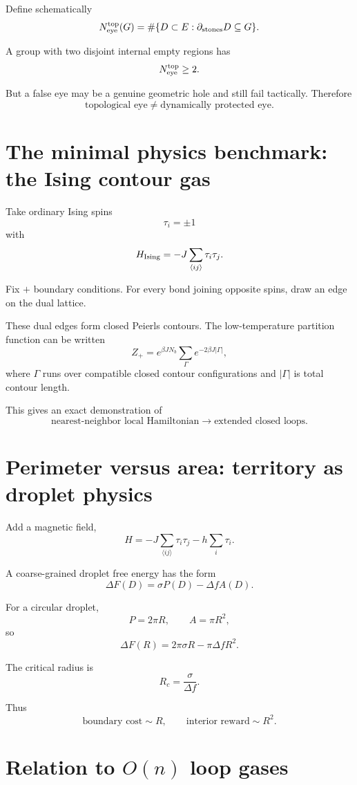\documentclass[11pt]{article}
\begin{document}
Define schematically
\[
N_{\rm eye}^{\rm top}(G)
=
\#\{
D\subset E:
\partial_{\rm stones}D\subseteq G
\}.
\]

A group with two disjoint internal empty regions has
\[
N_{\rm eye}^{\rm top}\geq2.
\]

But a false eye may be a genuine geometric hole and still fail tactically. Therefore
\[
\boxed{
\text{topological eye}
\neq
\text{dynamically protected eye}.
}
\]

\section{The minimal physics benchmark: the Ising contour gas}

Take ordinary Ising spins
\[
\tau_i=\pm1
\]
with
\[
H_{\rm Ising}
=
-J\sum_{\langle ij\rangle}\tau_i\tau_j.
\]

Fix \(+\) boundary conditions. For every bond joining opposite spins, draw an edge on the dual lattice.

These dual edges form closed Peierls contours. The low-temperature partition function can be written
\[
\boxed{
Z_+
=
e^{\beta JN_b}
\sum_{\Gamma}
e^{-2\beta J|\Gamma|},
}
\]
where \(\Gamma\) runs over compatible closed contour configurations and \(|\Gamma|\) is total contour length.

This gives an exact demonstration of
\[
\boxed{
\text{nearest-neighbor local Hamiltonian}
\longrightarrow
\text{extended closed loops}.
}
\]

\section{Perimeter versus area: territory as droplet physics}

Add a magnetic field,
\[
H
=
-J\sum_{\langle ij\rangle}\tau_i\tau_j
-h\sum_i\tau_i.
\]

A coarse-grained droplet free energy has the form
\[
\boxed{
\Delta F(D)
=
\sigma P(D)-\Delta f A(D).
}
\]

For a circular droplet,
\[
P=2\pi R,
\qquad
A=\pi R^2,
\]
so
\[
\Delta F(R)
=
2\pi\sigma R-\pi\Delta fR^2.
\]

The critical radius is
\[
R_c=\frac{\sigma}{\Delta f}.
\]

Thus
\[
\boxed{
\text{boundary cost}\sim R,
\qquad
\text{interior reward}\sim R^2.
}
\]

\section{Relation to \(O(n)\) loop gases}
\end{document}
